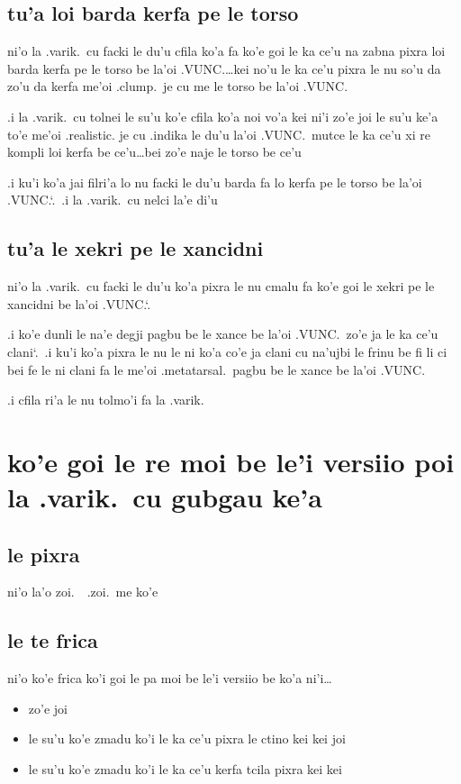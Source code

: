 \documentclass{report}
\newcommand\sds{\spacefactor\sfcode`.\ \space}
\begin{document}
\subsection{tu'a loi barda kerfa pe le torso}
ni'o la .varik.\ cu facki le du'u cfila ko'a fa ko'e goi le ka ce'u na zabna pixra loi barda kerfa pe le torso be la'oi .VUNC.\ldots kei no'u le ka ce'u pixra le nu so'u da zo'u da kerfa me'oi .clump.\ je cu me le torso be la'oi .VUNC.

.i la .varik.\ cu tolnei le su'u ko'e cfila ko'a noi vo'a kei ni'i zo'e joi le su'u ke'a to'e me'oi .realistic. je cu .indika le du'u la'oi .VUNC.\ mutce le ka ce'u xi re kompli loi kerfa be ce'u\ldots bei zo'e naje le torso be ce'u

.i ku'i ko'a jai filri'a lo nu facki le du'u barda fa lo kerfa pe le torso be la'oi .VUNC.\sds  .i la .varik.\ cu nelci la'e di'u

\subsection{tu'a le xekri pe le xancidni}
ni'o la .varik.\ cu facki le du'u ko'a pixra le nu cmalu fa ko'e goi le xekri pe le xancidni be la'oi .VUNC.\sds

.i ko'e dunli le na'e degji pagbu be le xance be la'oi .VUNC.\ zo'e ja le ka ce'u clani\sds  .i ku'i ko'a pixra le nu le ni ko'a co'e ja clani cu na'ujbi le frinu be fi li ci bei fe le ni clani fa le me'oi .metatarsal.\ pagbu be le xance be la'oi .VUNC.

.i cfila ri'a le nu tolmo'i fa la .varik.

\section{ko'e goi le re moi be le'i versiio poi la .varik.\ cu gubgau ke'a}

\subsection{le pixra}
ni'o la'o zoi.\ \ .zoi.\ me ko'e

\subsection{le te frica}
ni'o ko'e frica ko'i goi le pa moi be le'i versiio be ko'a ni'i\ldots

\begin{itemize}
	\item zo'e joi
	\item le su'u ko'e zmadu ko'i le ka ce'u pixra le ctino kei kei joi
	\item le su'u ko'e zmadu ko'i le ka ce'u kerfa tcila pixra kei kei
\end{itemize}
\end{document}
